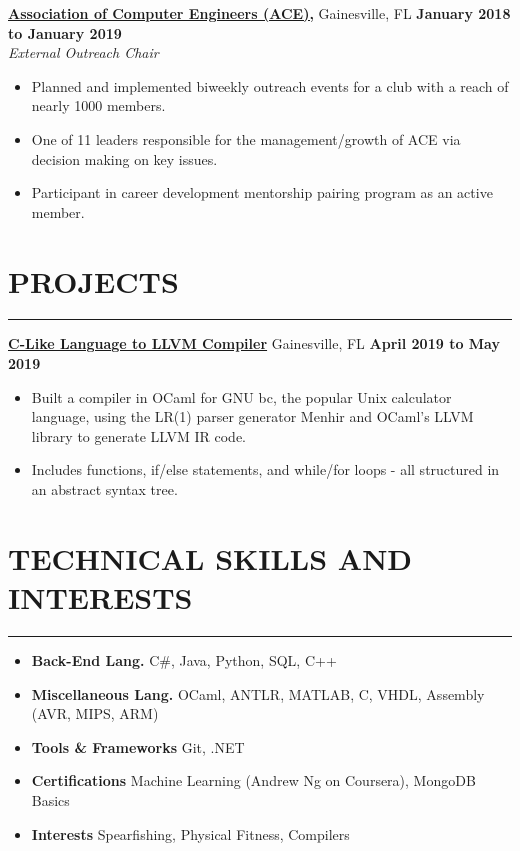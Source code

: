 \documentclass[11pt]{article} %
\begin{document}
		\noindent \href{https://uf-ace.com/}{\textbf{Association of Computer Engineers (ACE),}} Gainesville, FL \hfill\textbf{January 2018 to January 2019}\\
		\textit{External Outreach Chair}
		\begin{itemize}[noitemsep,nolistsep, label={-}]
			\item Planned and implemented biweekly outreach events for a club with a reach of nearly 1000 members.
			\item One of 11 leaders responsible for the management/growth of ACE via decision making on key issues.
			\item Participant in career development mentorship pairing program as an active member.
		\end{itemize}
		\vspace{.20cm}
	
	\section*{PROJECTS}
		\hrule \relax
		\vspace{.4cm}
		
		\noindent \href{https://github.com/hodsonus/programming-language-concepts}{\textbf{C-Like Language to LLVM Compiler}} Gainesville, FL  \hfill\textbf{April 2019 to May 2019}
		\begin{itemize}[noitemsep,nolistsep, label={-}]
			\item Built a compiler in OCaml for GNU bc, the popular Unix calculator language, using the LR(1) parser generator Menhir and OCaml's LLVM library to generate LLVM IR code.
			\item Includes functions, if/else statements, and while/for loops - all structured in an abstract syntax tree.
		\end{itemize}
		
		\vspace{.20cm}
	
	\section*{TECHNICAL SKILLS AND INTERESTS}
		\hrule \relax
		\vspace{.4cm}
		
		\begin{itemize}[noitemsep,nolistsep, label={}]
			\item \textbf{Back-End Lang.}                    \tabto*{5cm} C\#, Java, Python, SQL, C++
			\item \textbf{Miscellaneous Lang.}             \tabto*{5cm} OCaml, ANTLR, MATLAB, C, VHDL, Assembly (AVR, MIPS, ARM)
			\item \textbf{Tools \& Frameworks}  \tabto*{5cm} Git, .NET
			\item \textbf{Certifications}			   \tabto*{5cm} Machine Learning (Andrew Ng on Coursera), MongoDB Basics
			\item \textbf{Interests}                     \tabto*{5cm} Spearfishing, Physical Fitness, Compilers
		\end{itemize}
		
\end{document}

